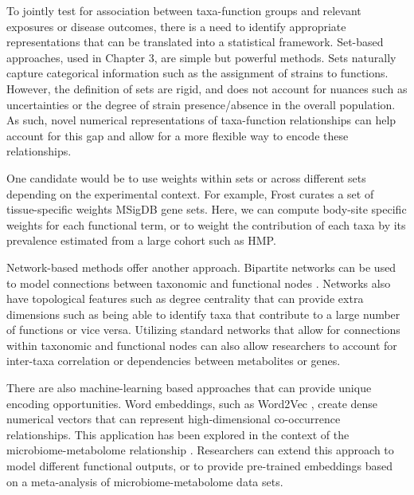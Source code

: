 To jointly test for association between taxa-function groups and relevant exposures or disease outcomes, there is a need to identify appropriate representations that can be translated into a statistical framework. Set-based approaches, used in Chapter 3, are simple but powerful methods. Sets naturally capture categorical information such as the assignment of strains to functions. However, the definition of sets are rigid, and does not account for nuances such as uncertainties or the degree of strain presence/absence in the overall population. As such, novel numerical representations of taxa-function relationships can help account for this gap and allow for a more flexible way to encode these relationships. 

One candidate would be to use weights within sets or across different sets depending on the experimental context. For example, Frost \cite{frost2018computation} curates a set of tissue-specific weights MSigDB gene sets. Here, we can compute body-site specific weights for each functional term, or to weight the contribution of each taxa by its prevalence estimated from a large cohort such as HMP.  

Network-based methods offer another approach. Bipartite networks can be used to model connections between taxonomic and functional nodes \cite{tian2020decipheringa}. Networks also have topological features such as degree centrality that can provide extra dimensions such as being able to identify taxa that contribute to a large number of functions or vice versa. Utilizing standard networks that allow for connections within taxonomic and functional nodes can also allow researchers to account for inter-taxa correlation or dependencies between metabolites or genes. 

There are also machine-learning based approaches that can provide unique encoding opportunities. Word embeddings, such as Word2Vec \cite{mikolov2013efficient}, create dense numerical vectors that can represent high-dimensional co-occurrence relationships. This application has been explored in the context of the microbiome-metabolome relationship \cite{morton2019learning}. Researchers can extend this approach to model different functional outputs, or to provide pre-trained embeddings based on a meta-analysis of microbiome-metabolome data sets.  

